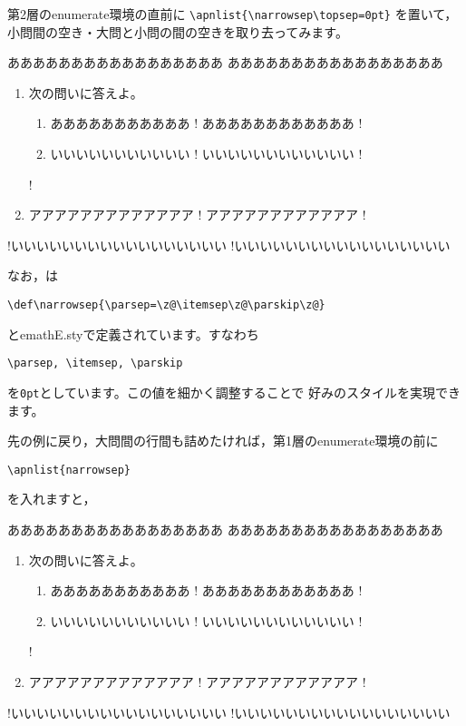 \documentclass[fleqn,a4j]{jarticle}
\begin{document}
第2層の\textsf{enumerate}環境の直前に
\verb+\apnlist{\narrowsep\topsep=0pt}+
を置いて，小問間の空き・大問と小問の間の空きを取り去ってみます。

\begin{showpEx}{}
あああああああああああああああああ
あああああああああああああああああ
\begin{enumerate}[1.~]
  \item 次の問いに答えよ。
\apnlist{\narrowsep\topsep=0pt}
    \begin{enumerate}[(1)]
!      \item あああああああああああ
!       ああああああああああああ
!      \item いいいいいいいいいいい
!       いいいいいいいいいいいい
!    \end{enumerate}
!  \item アアアアアアアアアアアアア
!   アアアアアアアアアアアア
!\end{enumerate}
!いいいいいいいいいいいいいいいいい
!いいいいいいいいいいいいいいいいい
\end{showpEx}

なお，は
\begin{jquote}
\begin{verbatim}
\def\narrowsep{\parsep=\z@\itemsep\z@\parskip\z@}
\end{verbatim}
\end{jquote}
と\textsf{emathE.sty}で定義されています。すなわち
\begin{jquote}
\begin{verbatim}
\parsep, \itemsep, \parskip
\end{verbatim}
\end{jquote}
を\verb+0pt+としています。この値を細かく調整することで
好みのスタイルを実現できます。

先の例に戻り，大問間の行間も詰めたければ，第1層の\textsf{enumerate}環境の前に
\begin{jquote}
\begin{verbatim}
\apnlist{narrowsep}
\end{verbatim}
\end{jquote}
を入れますと，

\begin{showpEx}{}
あああああああああああああああああ
あああああああああああああああああ
\apnlist{\narrowsep}
\begin{enumerate}[1.~]
  \item 次の問いに答えよ。
\apnlist{\narrowsep\topsep=0pt}
    \begin{enumerate}[(1)]
!      \item あああああああああああ
!       ああああああああああああ
!      \item いいいいいいいいいいい
!       いいいいいいいいいいいい
!    \end{enumerate}
!  \item アアアアアアアアアアアアア
!   アアアアアアアアアアアア
!\end{enumerate}
!いいいいいいいいいいいいいいいいい
!いいいいいいいいいいいいいいいいい
\end{showpEx}
\end{document}
